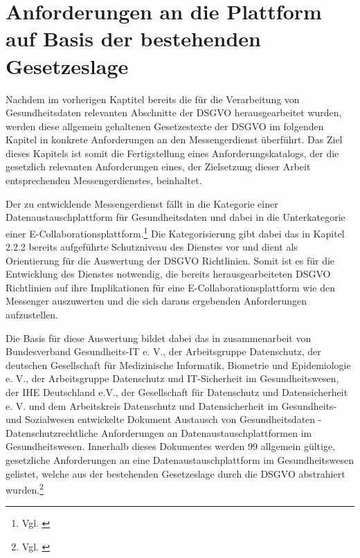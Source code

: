 \section{Anforderungen an die Plattform auf Basis der bestehenden Gesetzeslage}\label{section:aadpabsbg}
Nachdem im vorherigen Kaptitel bereits die für die Verarbeitung von Gesundheitsdaten relevanten Abschnitte der DSGVO herausgearbeitet wurden, werden diese allgemein gehaltenen Gesetzestexte der DSGVO im folgenden Kapitel in konkrete Anforderungen an den Messengerdienst überführt.  Das Ziel dieses Kapitels ist somit die Fertigstellung eines Anforderungskatalogs, der die gesetzlich relevanten Anforderungen eines, der Zielsetzung dieser Arbeit entsprechenden Messengerdienstes, beinhaltet.

Der zu entwicklende Messengerdienst fällt in die Kategorie einer Datenaustauschplattform für Gesundheitsdaten und dabei in die Unterkategorie einer E-Collaborationsplattform.\footnote{Vgl. \cite[S. 14 ff.]{Bundesverband-Gesundheits-IT-e.V.2016}} Die Kategorisierung gibt dabei das in Kapitel 2.2.2 bereits aufgeführte Schutzniveau des Dienstes vor und dient als Orientierung für die Auswertung der DSGVO Richtlinien. Somit ist es für die Entwicklung des Dienstes notwendig, die bereits herausgearbeiteten DSGVO Richtlinien auf ihre Implikationen für eine E-Collaborationsplattform wie den Messenger auszuwerten und die sich daraus ergebenden Anforderungen aufzustellen. 

Die Basis für diese Auswertung bildet dabei das in zusammenarbeit von Bundesverband Gesundheits-IT e. V., der Arbeitsgruppe Datenschutz, der deutschen Gesellschaft für Medizinische Informatik, Biometrie und Epidemiologie e. V., der Arbeitsgruppe Datenschutz und IT-Sicherheit im Gesundheitswesen, der IHE Deutschland e.V., der Gesellschaft für Datenschutz und Datensicherheit e. V. und dem Arbeitskreis Datenschutz und Datensicherheit im Gesundheits- und Sozialwesen entwickelte Dokument \glqq Austausch von Gesundheitsdaten - Datenschutzrechtliche Anforderungen an Datenaustauschplattformen im Gesundheitswesen\grqq. Innerhalb dieses Dokumentes werden 99 allgemein gültige, gesetzliche Anforderungen an eine Datenaustauschplattform im Gesundheitswesen gelistet, welche aus der bestehenden Gesetzeslage durch die DSGVO abstrahiert wurden.\footnote{Vgl. \cite[S. 19 ff.]{Bundesverband-Gesundheits-IT-e.V.2016}}

